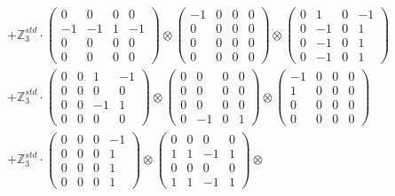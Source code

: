 \documentclass{article}
\begin{document}
{\begin{align}
        &+ \label{Rs1-Rc16-Solution-6-c4} \mathbb{Z}_3^{std} \cdot 
            \begin{pmatrix} 0 & 0 & 0 & 0 \\ -1 & -1 & 1 & -1 \\ 0 & 0 & 0 & 0 \\ 0 & 0 & 0 & 0 \end{pmatrix} \otimes 
            \begin{pmatrix} -1 & 0 & 0 & 0 \\ 0 & 0 & 0 & 0 \\ 0 & 0 & 0 & 0 \\ 0 & 0 & 0 & 0 \end{pmatrix} \otimes 
            \begin{pmatrix} 0 & 1 & 0 & -1 \\ 0 & -1 & 0 & 1 \\ 0 & -1 & 0 & 1 \\ 0 & -1 & 0 & 1 \end{pmatrix} \\ 
        &+ \label{Rs1-Rc16-Solution-6-c5} \mathbb{Z}_3^{std} \cdot 
            \begin{pmatrix} 0 & 0 & 1 & -1 \\ 0 & 0 & 0 & 0 \\ 0 & 0 & -1 & 1 \\ 0 & 0 & 0 & 0 \end{pmatrix} \otimes 
            \begin{pmatrix} 0 & 0 & 0 & 0 \\ 0 & 0 & 0 & 0 \\ 0 & 0 & 0 & 0 \\ 0 & -1 & 0 & 1 \end{pmatrix} \otimes 
            \begin{pmatrix} -1 & 0 & 0 & 0 \\ 1 & 0 & 0 & 0 \\ 0 & 0 & 0 & 0 \\ 0 & 0 & 0 & 0 \end{pmatrix} \\ 
        &+ \label{Rs1-Rc16-Solution-6-c6} \mathbb{Z}_3^{std} \cdot 
            \begin{pmatrix} 0 & 0 & 0 & -1 \\ 0 & 0 & 0 & 1 \\ 0 & 0 & 0 & 1 \\ 0 & 0 & 0 & 1 \end{pmatrix} \otimes 
            \begin{pmatrix} 0 & 0 & 0 & 0 \\ 1 & 1 & -1 & 1 \\ 0 & 0 & 0 & 0 \\ 1 & 1 & -1 & 1 \end{pmatrix} \otimes 

\end{align}}
\end{document}

